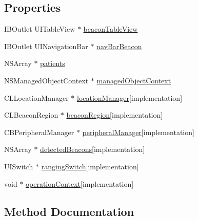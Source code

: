 \subsection*{Properties}
\begin{DoxyCompactItemize}
\item 
I\+B\+Outlet U\+I\+Table\+View $\ast$ \hyperlink{interface_beacon_view_controller_a8793241e381787727d980a0304fbd78c}{beacon\+Table\+View}
\item 
I\+B\+Outlet U\+I\+Navigation\+Bar $\ast$ \hyperlink{interface_beacon_view_controller_ac1589c64e96cf146dbb12e8994086d86}{nav\+Bar\+Beacon}
\item 
N\+S\+Array $\ast$ \hyperlink{interface_beacon_view_controller_a7e9950937ddff0cc90f9db7df07a6cef}{patients}
\item 
N\+S\+Managed\+Object\+Context $\ast$ \hyperlink{interface_beacon_view_controller_a54afc5e9e56203113e36017d669c73c1}{managed\+Object\+Context}
\item 
C\+L\+Location\+Manager $\ast$ \hyperlink{interface_beacon_view_controller_a5d85a26337748cf4f063a533ab01a3f8}{location\+Manager}{\ttfamily  \mbox{[}implementation\mbox{]}}
\item 
C\+L\+Beacon\+Region $\ast$ \hyperlink{interface_beacon_view_controller_a2cc63d4140e6ec379df7357bc7bd04f1}{beacon\+Region}{\ttfamily  \mbox{[}implementation\mbox{]}}
\item 
C\+B\+Peripheral\+Manager $\ast$ \hyperlink{interface_beacon_view_controller_a73b87fab61673b3d597e472076f064c4}{peripheral\+Manager}{\ttfamily  \mbox{[}implementation\mbox{]}}
\item 
N\+S\+Array $\ast$ \hyperlink{interface_beacon_view_controller_a2002b39c2b678c343f2f622b25b27e06}{detected\+Beacons}{\ttfamily  \mbox{[}implementation\mbox{]}}
\item 
U\+I\+Switch $\ast$ \hyperlink{interface_beacon_view_controller_a0b9ecc9bde1f59fe377c9346ab48e1bc}{ranging\+Switch}{\ttfamily  \mbox{[}implementation\mbox{]}}
\item 
void $\ast$ \hyperlink{interface_beacon_view_controller_aded3b4994589bb288ae1bb83111e4e57}{operation\+Context}{\ttfamily  \mbox{[}implementation\mbox{]}}
\end{DoxyCompactItemize}


\subsection{Method Documentation}
\hypertarget{interface_beacon_view_controller_af8ed379dda505c8a4c98ff1aa11f2d43}{}
